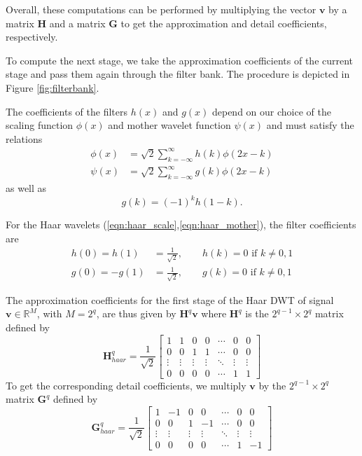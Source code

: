 Overall, these computations can be performed by multiplying the vector $\bm v$ by a matrix $\bm H$ and a matrix $\bm G$ to get the approximation and detail coefficients, respectively.

To compute the next stage, we take the approximation coefficients of the current stage and pass them again through the filter bank.
The procedure is depicted in Figure \ref{fig:filterbank}.

The coefficients of the filters $h(x)$ and $g(x)$ depend on our choice of the scaling function $\phi(x)$ and mother wavelet function $\psi(x)$ and must satisfy the relations
\begin{equation*}
  \begin{split}
    \phi(x) &= \sqrt{2}\sum_{k=-\infty}^\infty h(k)\phi(2x - k)\\
    \psi(x) &= \sqrt{2}\sum_{k=-\infty}^\infty g(k)\phi(2x - k)
  \end{split}
\end{equation*}
as well as
\begin{equation*}
  g(k) = (-1)^k h(1-k).
\end{equation*}

For the Haar wavelets (\ref{eqn:haar_scale},\ref{eqn:haar_mother}), the filter coefficients are
\begin{equation*}
  \begin{split}
    h(0) = h(1) &= \frac{1}{\sqrt{2}}, \qquad h(k) = 0 \mbox{  if $k\neq 0,1$}\\
    g(0) = -g(1) &= \frac{1}{\sqrt{2}}, \qquad g(k) = 0 \mbox{  if $k\neq 0,1$}
  \end{split}
\end{equation*}

The approximation coefficients for the first stage of the Haar DWT of signal $\bm v \in\mathbb{R}^M$, with $M=2^q$, are thus given by $\bm H^q \bm v$ where $\bm H^q$ is the $2^{q-1}\times 2^q$ matrix defined by
\begin{equation}
  \label{eqn:haar_H}
  \bm H^q_{haar} = \frac{1}{\sqrt{2}} \begin{bmatrix}
    1&1&0&0&\cdots&0&0\\
    0&0&1&1&\cdots&0&0\\
    \vdots&\vdots&\vdots&\vdots&\ddots&\vdots&\vdots\\
    0&0&0&0&\cdots&1&1
  \end{bmatrix}
\end{equation}
To get the corresponding detail coefficients, we multiply $\bm v$ by the $2^{q-1}\times 2^q$ matrix $\bm G^q$ defined by
\begin{equation}
  \label{eqn:haar_G}
  \bm G^q_{haar} = \frac{1}{\sqrt{2}} \begin{bmatrix}
    1&-1&0&0&\cdots&0&0\\
    0&0&1&-1&\cdots&0&0\\
    \vdots&\vdots&\vdots&\vdots&\ddots&\vdots&\vdots\\
    0&0&0&0&\cdots&1&-1
  \end{bmatrix}
\end{equation}

